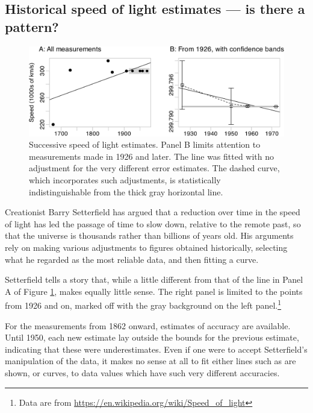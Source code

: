 \documentclass[
  10pt,
  b5paper]{book}
\begin{document}
\hypertarget{historical-speed-of-light-estimates-is-there-a-pattern}{%
\subsection*{Historical speed of light estimates --- is there a pattern?}\label{historical-speed-of-light-estimates-is-there-a-pattern}}

\begin{figure}[H]

{\centering \includegraphics{07-regress_files/figure-latex/plot-c-data-1} 

}

\caption{Successive speed of light estimates.  Panel B 
limits attention to measurements made in 1926 and later. 
The line was fitted with no adjustment for the very
different error estimates.  The dashed curve, which 
incorporates such adjustments, is statistically 
indistinguishable from the thick gray horizontal line.}\label{fig:plot-c-data}
\end{figure}

Creationist Barry Setterfield has argued that a reduction over
time in the speed of light has led the passage of time to slow
down, relative to the remote past, so that the universe is
thousands rather than billions of years old. His arguments rely
on making various adjustments to figures obtained historically,
selecting what he regarded as the most reliable data, and
then fitting a curve.

Setterfield tells a story that, while a little different from that of
the line in Panel A of Figure \ref{fig:plot-c-data}, makes equally
little sense. The right panel is limited to the points from 1926
and on, marked off with the gray background on the left panel.\footnote{Data
  are from \url{https://en.wikipedia.org/wiki/Speed_of_light}}

For the measurements from 1862 onward, estimates of accuracy
are available. Until 1950, each new estimate lay outside the
bounds for the previous estimate, indicating that these
were underestimates.
Even if one were to accept Setterfield's manipulation of the data,
it makes no sense at all to fit either lines such as are shown, or
curves, to data values which have such very different
accuracies.
\end{document}

